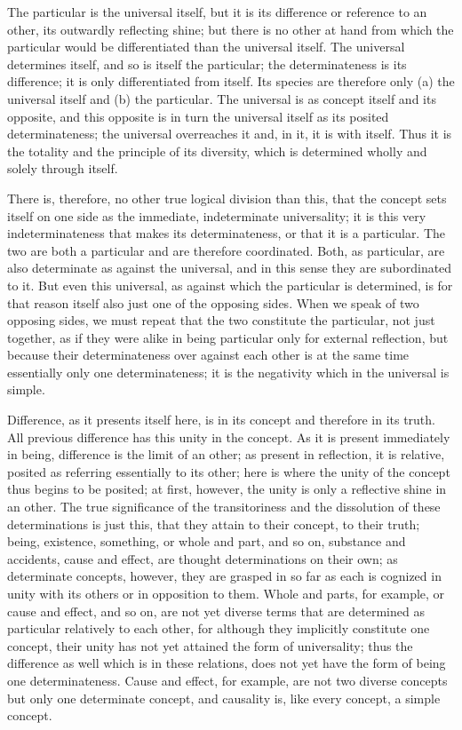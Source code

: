 The particular is the universal itself,
but it is its difference or reference to an other,
its outwardly reflecting shine;
but there is no other at hand from which
the particular would be differentiated
than the universal itself.
The universal determines itself,
and so is itself the particular;
the determinateness is its difference;
it is only differentiated from itself.
Its species are therefore
only (a) the universal itself
and (b) the particular.
The universal is as concept itself and its opposite,
and this opposite is in turn the universal itself
as its posited determinateness;
the universal overreaches it
and, in it, it is with itself.
Thus it is the totality and the principle of its diversity,
which is determined wholly and solely through itself.

There is, therefore, no other
true logical division than this,
that the concept sets itself on one side
as the immediate, indeterminate universality;
it is this very indeterminateness
that makes its determinateness,
or that it is a particular.
The two are both a particular
and are therefore coordinated.
Both, as particular, are also
determinate as against the universal,
and in this sense they are subordinated to it.
But even this universal,
as against which the particular is determined,
is for that reason itself also
just one of the opposing sides.
When we speak of two opposing sides,
we must repeat that the two constitute the particular,
not just together, as if they were alike
in being particular only for external reflection,
but because their determinateness over against each other is
at the same time essentially only one determinateness;
it is the negativity which in the universal is simple.

Difference, as it presents itself here,
is in its concept and therefore in its truth.
All previous difference has this unity in the concept.
As it is present immediately in being,
difference is the limit of an other;
as present in reflection, it is relative,
posited as referring essentially to its other;
here is where the unity of the concept
thus begins to be posited;
at first, however, the unity is only
a reflective shine in an other.
The true significance of the transitoriness
and the dissolution of these determinations is just this,
that they attain to their concept, to their truth;
being, existence, something,
or whole and part, and so on,
substance and accidents, cause and effect,
are thought determinations on their own;
as determinate concepts, however,
they are grasped in so far as each
is cognized in unity with its others
or in opposition to them.
Whole and parts, for example,
or cause and effect, and so on,
are not yet diverse terms
that are determined as particular
relatively to each other,
for although they implicitly constitute one concept,
their unity has not yet attained the form of universality;
thus the difference as well which is in these relations,
does not yet have the form of being one determinateness.
Cause and effect, for example, are not two diverse concepts
but only one determinate concept,
and causality is, like every concept,
a simple concept.

